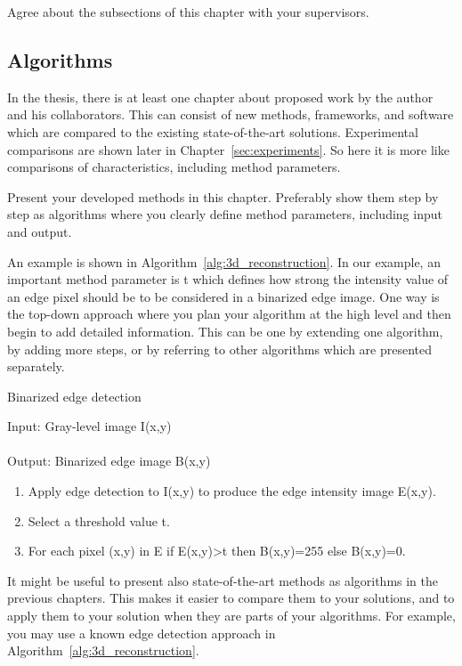 \documentclass{lutmscthesis}[2017/10/03]
\begin{document}
Agree about the subsections of this chapter with your supervisors.

\subsection{Algorithms}

In the thesis, there is at least one chapter about proposed work by the author and his collaborators. 
This can consist of new methods, frameworks, and software which are compared to the existing state-of-the-art solutions. 
Experimental comparisons are shown later in Chapter~\ref{sec:experiments}.
So here it is more like comparisons of characteristics, including method parameters. 

Present your developed methods in this chapter. 
Preferably show them step by step as algorithms where you clearly define method parameters, including input and output. 

An example is shown in Algorithm~\ref{alg:3d_reconstruction}. 
In our example, an important method parameter is t which defines 
how strong the intensity value of an edge pixel should be to be considered in a binarized edge image. 
One way is the top-down approach where you plan your algorithm at the high level and then begin to add detailed information. 
This can be one by extending one algorithm, by adding more steps, or by referring to other algorithms which are presented separately. 

\begin{algorithm}[!ht]
  \caption{Binarized edge detection}
  \label{alg:3d_reconstruction}
\vspace{8pt}
Input: Gray-level image I(x,y)\\
\vspace{-8pt}\\
Output: Binarized edge image B(x,y)
  \begin{enumerate}
    \item Apply edge detection to I(x,y) to produce the edge intensity image E(x,y). 
    \item Select a threshold value t. 
    \item For each pixel (x,y) in E if E(x,y)>t then B(x,y)=255 else  B(x,y)=0. 
  \end{enumerate}
\end{algorithm}

It might be useful to present also state-of-the-art methods as algorithms in the previous chapters. 
This makes it easier to compare them to your solutions, and to apply them to your solution when they are parts of your algorithms. 
For example, you may use a known edge detection approach in Algorithm~\ref{alg:3d_reconstruction}.  
\end{document}
